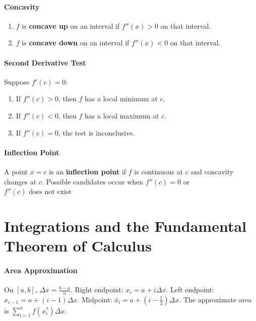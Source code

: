 \documentclass[oneside]{book}
\begin{document}
\paragraph{Concavity}{
    \begin{enumerate}
        \item $f$ is \textbf{concave up} on an interval if $f''(x)>0$ on that interval.
        \item $f$ is \textbf{concave down} on an interval if $f''(x)<0$ on that interval.
    \end{enumerate}
}

\paragraph{Second Derivative Test}{
Suppose $f'(c)=0$: 
\begin{enumerate}
    \item If $f''(c)>0$, then $f$ has a local minimum at $c$.
    \item If $f''(c)<0$, then $f$ has a local maximum at $c$.
    \item If $f''(c)=0$, the test is inconclusive.
\end{enumerate}
}

\paragraph{Inflection Point}{
A point $x=c$ is an \textbf{inflection point} if $f$ is continuous at $c$ and concavity changes at $c$. Possible candidates occur when
$f''(c)=0$ or $f''(c)\text{ does not exist}$
}


\section{Integrations and the Fundamental Theorem of Calculus}

\paragraph{Area Approximation}{
On $[a,b]$, $\Delta x=\frac{b-a}{n}$.
Right endpoint: $x_i=a+i\Delta x$. 
Left endpoint: $x_{i-1}=a+(i-1)\Delta x$.
Midpoint: $\bar{x}_i=a+\left(i-\frac12\right)\Delta x$.
The approximate area is $\sum_{i=1}^n f(x_i^*)\Delta x$.
}
\end{document}
